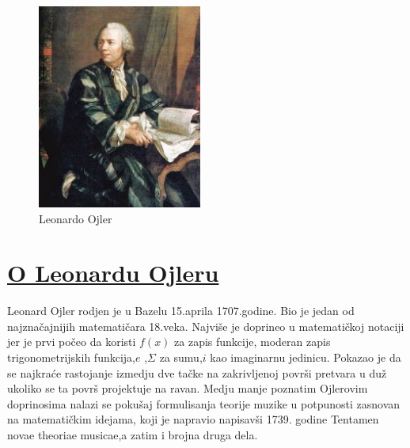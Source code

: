 \documentclass{article}
\begin{document}
\paragraph{}


\begin{figure}
  \begin{center}
    \includegraphics[width=0.48\textwidth]{lojlermodified.jpg}
  \end{center}
  \caption{Leonardo Ojler}
\end{figure}

\section*{\uline{O Leonardu Ojleru}}

Leonard Ojler rodjen je u Bazelu 15.aprila 1707.godine.
Bio je jedan od najznačajnijih matematičara 18.veka.
Najviše je doprineo u matematičkoj notaciji jer je prvi počeo
da koristi $f(x)$ za zapis funkcije, moderan zapis trigonometrijskih funkcija,$e$ ,$\Sigma$
za sumu,$i$ kao imaginarnu jedinicu.
Pokazao je da se najkraće rastojanje izmedju dve tačke na zakrivljenoj površi pretvara u duž ukoliko se ta površ projektuje na ravan.
Medju manje poznatim Ojlerovim doprinosima nalazi se pokušaj formulisanja teorije muzike u potpunosti zasnovan na matematičkim idejama, koji je napravio napisavši 1739. godine Tentamen novae theoriae musicae,a zatim i brojna druga dela.
\newpage{}
	
\end{document}
